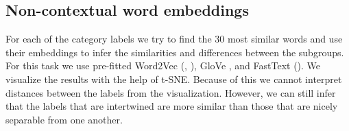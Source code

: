 \documentclass[fleqn,moreauthors,10pt]{ds_report}
\begin{document}
\subsection{Non-contextual word embeddings}
For each of the category labels we try to find the $30$ most similar words and use their embeddings to infer the similarities and differences between the subgroups. For this task we use pre-fitted Word2Vec (\cite{mikolov2013efficient}, \cite{mikolov2013distributed}), GloVe \cite{pennington2014glove}, and FastText (\cite{bojanowski2016enriching}). We visualize the results with the help of t-SNE. Because of this we cannot interpret distances between the labels from the visualization. However, we can still infer that the labels that are intertwined are more similar than those that are nicely separable from one another. %

\end{document}
